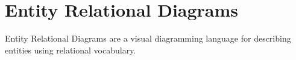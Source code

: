 \chapter{Entity Relational Diagrams}

Entity Relational Diagrams are a visual diagramming language for
describing entities using relational vocabulary.

